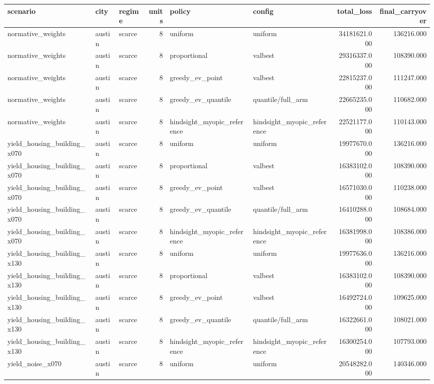 \begin{tabular}{lllrllrr}
\toprule
scenario & city & regime & units & policy & config & total\_loss & final\_carryover \\
\midrule
normative\_weights & austin & scarce & 8 & uniform & uniform & 34181621.000 & 136216.000 \\
normative\_weights & austin & scarce & 8 & proportional & valbest & 29316337.000 & 108390.000 \\
normative\_weights & austin & scarce & 8 & greedy\_ev\_point & valbest & 22815237.000 & 111247.000 \\
normative\_weights & austin & scarce & 8 & greedy\_ev\_quantile & quantile/full\_arm & 22665235.000 & 110682.000 \\
normative\_weights & austin & scarce & 8 & hindsight\_myopic\_reference & hindsight\_myopic\_reference & 22521177.000 & 110143.000 \\
yield\_housing\_building\_x070 & austin & scarce & 8 & uniform & uniform & 19977670.000 & 136216.000 \\
yield\_housing\_building\_x070 & austin & scarce & 8 & proportional & valbest & 16383102.000 & 108390.000 \\
yield\_housing\_building\_x070 & austin & scarce & 8 & greedy\_ev\_point & valbest & 16571030.000 & 110238.000 \\
yield\_housing\_building\_x070 & austin & scarce & 8 & greedy\_ev\_quantile & quantile/full\_arm & 16410288.000 & 108684.000 \\
yield\_housing\_building\_x070 & austin & scarce & 8 & hindsight\_myopic\_reference & hindsight\_myopic\_reference & 16381998.000 & 108386.000 \\
yield\_housing\_building\_x130 & austin & scarce & 8 & uniform & uniform & 19977636.000 & 136216.000 \\
yield\_housing\_building\_x130 & austin & scarce & 8 & proportional & valbest & 16383102.000 & 108390.000 \\
yield\_housing\_building\_x130 & austin & scarce & 8 & greedy\_ev\_point & valbest & 16492724.000 & 109625.000 \\
yield\_housing\_building\_x130 & austin & scarce & 8 & greedy\_ev\_quantile & quantile/full\_arm & 16322661.000 & 108021.000 \\
yield\_housing\_building\_x130 & austin & scarce & 8 & hindsight\_myopic\_reference & hindsight\_myopic\_reference & 16300254.000 & 107793.000 \\
yield\_noise\_x070 & austin & scarce & 8 & uniform & uniform & 20548282.000 & 140346.000 \\

\end{tabular}
